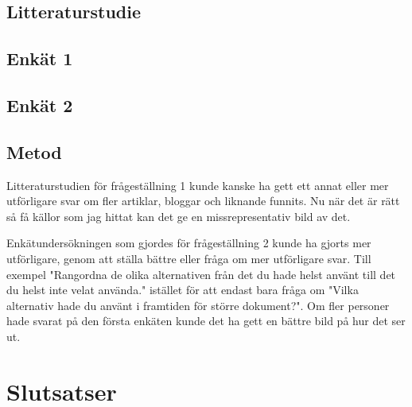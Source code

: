 \subsection{Litteraturstudie}

\subsection{Enkät 1}

\subsection{Enkät 2}

\subsection{Metod}
Litteraturstudien för frågeställning 1 kunde kanske ha gett ett annat eller mer utförligare svar om fler artiklar, bloggar och liknande funnits. Nu när det är rätt så få källor som jag hittat kan det ge en missrepresentativ bild av det.

Enkätundersökningen som gjordes för frågeställning 2 kunde ha gjorts mer utförligare, genom att ställa bättre eller fråga om mer utförligare svar. Till exempel "Rangordna de olika alternativen från det du hade helst använt till det du helst inte velat använda." istället för att endast bara fråga om "Vilka alternativ hade du använt i framtiden för större dokument?". Om fler personer hade svarat på den första enkäten kunde det ha gett en bättre bild på hur det ser ut.

\section{Slutsatser}
\label{sec:conclusions-tuhkala}



